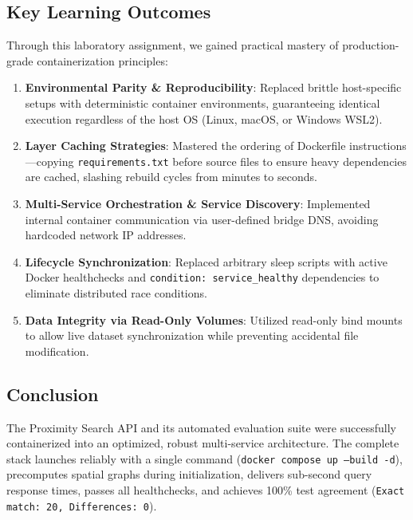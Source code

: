 \documentclass[11pt,a4paper]{article}
\begin{document}
\subsection{Key Learning Outcomes}
Through this laboratory assignment, we gained practical mastery of production-grade containerization principles:
\begin{enumerate}[label=\alph*), itemsep=2pt, topsep=2pt]
    \item \textbf{Environmental Parity \& Reproducibility}: Replaced brittle host-specific setups with deterministic container environments, guaranteeing identical execution regardless of the host OS (Linux, macOS, or Windows WSL2).
    \item \textbf{Layer Caching Strategies}: Mastered the ordering of Dockerfile instructions—copying \texttt{requirements.txt} before source files to ensure heavy dependencies are cached, slashing rebuild cycles from minutes to seconds.
    \item \textbf{Multi-Service Orchestration \& Service Discovery}: Implemented internal container communication via user-defined bridge DNS, avoiding hardcoded network IP addresses.
    \item \textbf{Lifecycle Synchronization}: Replaced arbitrary sleep scripts with active Docker healthchecks and \texttt{condition: service\_healthy} dependencies to eliminate distributed race conditions.
    \item \textbf{Data Integrity via Read-Only Volumes}: Utilized read-only bind mounts to allow live dataset synchronization while preventing accidental file modification.
\end{enumerate}

\subsection{Conclusion}
The Proximity Search API and its automated evaluation suite were successfully containerized into an optimized, robust multi-service architecture. The complete stack launches reliably with a single command (\texttt{docker compose up --build -d}), precomputes spatial graphs during initialization, delivers sub-second query response times, passes all healthchecks, and achieves 100\% test agreement (\texttt{Exact match: 20, Differences: 0}).
\end{document}
